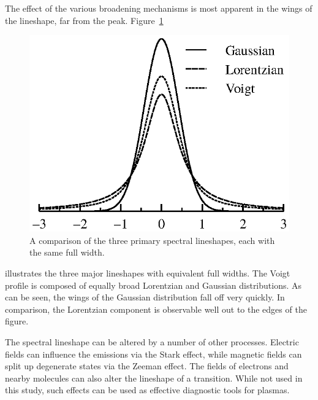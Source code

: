 The effect of the various broadening mechanisms is most apparent in the wings of
the lineshape, far from the peak. Figure~\ref{fig:lineshapes}
\begin{figure}
  \centering
  \includegraphics{./chapters/theory/figures/lineshapes.eps}
  \caption{A comparison of the three primary spectral lineshapes, each with the
  same full width.}
  \label{fig:lineshapes}
\end{figure}
illustrates the three major lineshapes with equivalent full widths. The Voigt
profile is composed of equally broad Lorentzian and Gaussian distributions. As
can be seen, the wings of the Gaussian distribution fall off very quickly. In
comparison, the Lorentzian component is observable well out to the edges of the
figure. 

The spectral lineshape can be altered by a number of other processes. Electric
fields can influence the emissions via the Stark effect, while magnetic fields
can split up degenerate states via the Zeeman effect. The fields of electrons
and nearby molecules can also alter the lineshape of a transition. While not
used in this study, such effects can be used as effective diagnostic tools for
plasmas.
